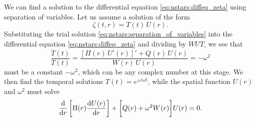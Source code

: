 We can find a solution to the differential equation \eqref{eq:nstars:diffeq_zeta} using separation of variables.
Let us assume a solution of the form
\begin{equation}
	\zeta(t,r) = T(t) \, U(r) .
\label{eq:nstars:separation_of_variables}
\end{equation}
Substituting the trial solution \eqref{eq:nstars:separation_of_variables} into the differential equation \eqref{eq:nstars:diffeq_zeta} and dividing by $W U T$, we see that
\begin{equation}
	\frac{\ddot{T}(t)}{T(t)} = \frac{\left[ \Pi(r) \, U'(r) \right]' + Q(r) \, U(r)}{W(r) \, U(r)} = -\omega^2
\end{equation}
must be a constant $-\omega^2$, which can be any complex number at this stage.
We then find the temporal solutions $T(t) = e^{\pm i \omega t}$, while the spatial function $U(r)$ and $\omega^2$ must solve
\begin{equation}
	\odv*{ \left[ \Pi(r) \odv{U(r)}{r} \right] }{r} + \bigg[ Q(r) + \omega^2 W(r) \bigg] U(r) = 0 .
\label{eq:nstars:diffeq_U}
\end{equation}

